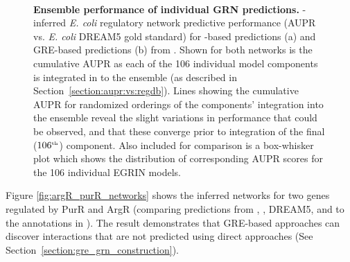 \begin{figure}[hp]
\centering
\mbox{
}
\caption[Ensemble performance of individual GRN predictions]{
  \textbf{Ensemble performance of individual GRN predictions.}
  \egrine-inferred \textit{E. coli} regulatory network predictive
  performance (AUPR vs. {\it E. coli} DREAM5 \cite{Marbach2012} gold
  standard) for \nwinf-based predictions (a) and GRE-based predictions
  (b) from \egrine. Shown for both networks is the cumulative AUPR as
  each of the 106 individual model components is integrated in to the
  ensemble (as described in
  Section~\ref{section:aupr:vs:regdb}). Lines showing the cumulative
  AUPR for randomized orderings of the components' integration into
  the ensemble reveal the slight variations in performance that could
  be observed, and that these converge prior to integration of the
  final ($106^{\text{\tiny th}}$) component. Also included for
  comparison is a box-whisker plot which shows the distribution of
  corresponding AUPR scores for the 106 individual EGRIN models. }
\label{fig:cumulative_auprs}
\end{figure} 

Figure \ref{fig:argR_purR_networks} shows the inferred networks for
two genes regulated by PurR and ArgR (comparing predictions from
\egrine, , DREAM5, and  to the
annotations in \rdb). The result demonstrates that GRE-based
approaches can discover interactions that are not predicted using
direct approaches (See Section~\ref{section:gre_grn_construction}).

